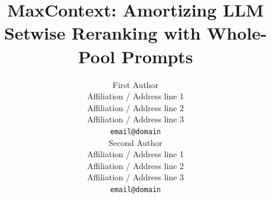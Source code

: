 \documentclass[11pt]{article}
\title{MaxContext: Amortizing LLM Setwise Reranking with Whole-Pool Prompts}
\author{First Author \\
  Affiliation / Address line 1 \\
  Affiliation / Address line 2 \\
  Affiliation / Address line 3 \\
  \texttt{email@domain} \\\And
  Second Author \\
  Affiliation / Address line 1 \\
  Affiliation / Address line 2 \\
  Affiliation / Address line 3 \\
  \texttt{email@domain} \\}
\begin{document}
\maketitle
\begin{abstract}

\end{abstract}


% 
% 
% 
% 
% 
% 
% 

% 
% 

%


% 
\end{document}
